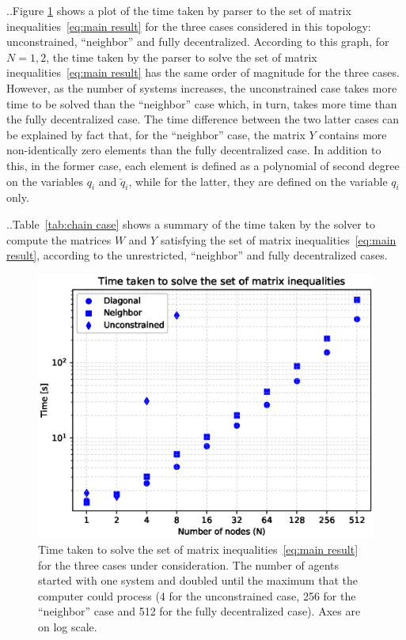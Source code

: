 \documentclass[10pt,twocolumn,twoside]{IEEEtran}
\newcounter{para}
\newcommand\mypara{\par \thesection.\refstepcounter{para}\thepara.\space}
\theoremstyle{plain}
\theoremstyle{definition}
\theoremstyle{remark}
\begin{document}
\mypara Figure \ref{fig:time graph} shows a plot of the time taken by parser to the set of matrix inequalities~\eqref{eq:main result} for the three cases considered in this topology: unconstrained, ``neighbor'' and fully decentralized.  According to this graph, for $N=1,2$, the time taken by the parser to solve the set of matrix inequalities~\eqref{eq:main result} has the same order of magnitude for the three cases. However, as the number of systems increases, the unconstrained case takes more time to be solved than the ``neighbor'' case which, in turn, takes more time than the fully decentralized case. The time difference between the two latter cases can be explained by fact that, for the ``neighbor'' case, the matrix $Y$ contains more non-identically zero elements than the fully decentralized case. In addition to this, in the former case, each element is defined as a polynomial of second degree on the variables $q_i$ and $\breve{q}_i$, while for the latter, they are defined on the variable $q_i$ only.

\mypara Table~\ref{tab:chain case} shows a summary of the time taken by the solver to compute the matrices $W$ and $Y$ satisfying the set of matrix inequalities~\eqref{eq:main result}, according to the unrestricted, ``neighbor'' and fully decentralized cases.

\begin{figure}[htpb!]
	\centering
	\includegraphics[width=\columnwidth]{./imgs/ParserTimes}
	\caption{Time taken to solve the set of matrix inequalities~\eqref{eq:main result} for the three cases under consideration. The number of agents started with one system and doubled  until the maximum that the computer could process (4 for the unconstrained case, 256 for the ``neighbor'' case and 512 for the fully decentralized case). Axes are on log scale.}
	\label{fig:time graph}
\end{figure}
\end{document}
